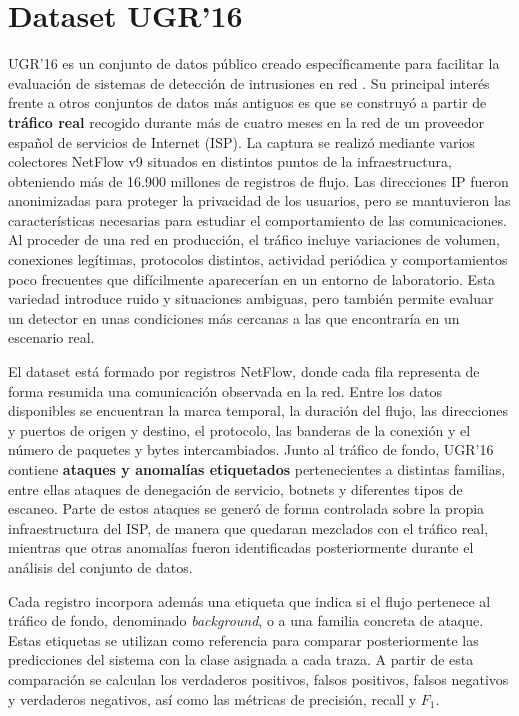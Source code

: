 \section{Dataset UGR'16}
\label{sec:concep_ugr16}

UGR'16 es un conjunto de datos público creado específicamente para facilitar la evaluación de sistemas de detección de intrusiones en red \cite{ugr16}. Su principal interés frente a otros conjuntos de datos más antiguos es que se construyó a partir de \textbf{tráfico real} recogido durante más de cuatro meses en la red de un proveedor español de servicios de Internet (ISP). La captura se realizó mediante varios colectores NetFlow v9 situados en distintos puntos de la infraestructura, obteniendo más de 16.900 millones de registros de flujo. Las direcciones IP fueron anonimizadas para proteger la privacidad de los usuarios, pero se mantuvieron las características necesarias para estudiar el comportamiento de las comunicaciones. Al proceder de una red en producción, el tráfico incluye variaciones de volumen, conexiones legítimas, protocolos distintos, actividad periódica y comportamientos poco frecuentes que difícilmente aparecerían en un entorno de laboratorio. Esta variedad introduce ruido y situaciones ambiguas, pero también permite evaluar un detector en unas condiciones más cercanas a las que encontraría en un escenario real.

El dataset está formado por registros NetFlow, donde cada fila representa de forma resumida una comunicación observada en la red. Entre los datos disponibles se encuentran la marca temporal, la duración del flujo, las direcciones y puertos de origen y destino, el protocolo, las banderas de la conexión y el número de paquetes y bytes intercambiados. Junto al tráfico de fondo, UGR'16 contiene \textbf{ataques y anomalías etiquetados} pertenecientes a distintas familias, entre ellas ataques de denegación de servicio, botnets y diferentes tipos de escaneo. Parte de estos ataques se generó de forma controlada sobre la propia infraestructura del ISP, de manera que quedaran mezclados con el tráfico real, mientras que otras anomalías fueron identificadas posteriormente durante el análisis del conjunto de datos.

Cada registro incorpora además una etiqueta que indica si el flujo pertenece al tráfico de fondo, denominado \emph{background}, o a una familia concreta de ataque. Estas etiquetas se utilizan como referencia para comparar posteriormente las predicciones del sistema con la clase asignada a cada traza. A partir de esta comparación se calculan los verdaderos positivos, falsos positivos, falsos negativos y verdaderos negativos, así como las métricas de precisión, recall y $F_1$.

